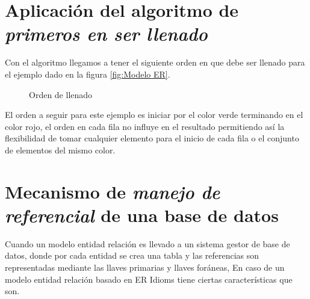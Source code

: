 \section{Aplicaci\'on del algoritmo de \textit{primeros en ser llenado}}
Con el algoritmo llegamos a tener el siguiente orden en que debe ser llenado para el ejemplo dado en la figura  \ref{fig:Modelo ER}.
\begin{figure}[H]
\centering
{}
\caption{Orden de llenado}
\label{fig:Orden de llenado}
\end{figure}
El orden a seguir para este ejemplo es iniciar por el color verde terminando en el color rojo, el orden en cada fila no influye en el resultado permitiendo as\'i la flexibilidad de tomar cualquier elemento para el inicio de cada fila o el conjunto de elementos del mismo color.
\section{Mecanismo de \textit{manejo de referencial} de una base de datos}
Cuando un modelo entidad relaci\'on es llevado a un sistema gestor de base de datos, donde por cada entidad se crea una tabla y las  referencias son representadas mediante las llaves primarias y llaves for\'aneas, En caso de un modelo entidad relaci\'on basado en ER Idioms tiene ciertas caracter\'isticas que son.
